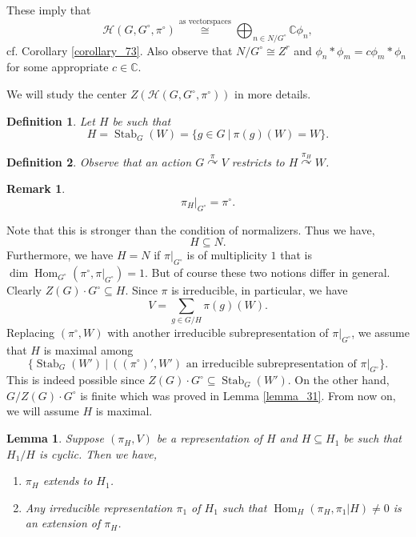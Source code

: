 \documentclass[8pt]{article}
\newtheorem{definition}{Definition}[section]
\newtheorem{lemma}{Lemma}[section]
\newtheorem{remark}{Remark}[section]
\DeclareMathOperator{\Stab}{Stab}
\DeclareMathOperator{\Hom}{Hom}
\newcommand{\C}[0]{\mathbb{C}}
\newcommand{\sep}[0]{\:|\:}
\newcommand{\hecke}[0]{\mathscr{H}}
\begin{document}
These imply that 
\begin{equation*}
  \hecke(G,G^\circ,\pi^\circ)\stackrel{\text{as vectorspaces}}{\cong}\bigoplus_{n\in N/G^\circ}\C\phi_n,
\end{equation*}
cf. Corollary \ref{corollary_73}. Also observe that $N/G^\circ\cong Z^r$ and $\phi_n\ast\phi_m = c\phi_m\ast\phi_n$ for some appropriate $c\in \C$.
\par We will study the center $Z(\hecke(G,G^\circ,\pi^\circ))$ in more details.

\begin{definition}
  Let $H$ be such that 
  \begin{equation*}
    H = \Stab_G(W) = \{g\in G\sep \pi(g)(W) = W\}.
  \end{equation*}
\end{definition}
\begin{definition}
  Observe that an action $G\stackrel{\pi}{\curvearrowright}V$ restricts to $H\stackrel{\pi_H}{\curvearrowright}W$. 
\end{definition}
\begin{remark}
  \begin{equation*}
    \pi_H|_{G^\circ} = \pi^\circ.
  \end{equation*}
\end{remark}
Note that this is stronger than the condition of normalizers. Thus we have, 
  \begin{equation*}
    H\subseteq N.
  \end{equation*}
  Furthermore, we have $H=N$ if $\pi|_{G^\circ}$ is of multiplicity $1$ that is $\dim\Hom_{G^\circ}(\pi^\circ,\pi|_{G^\circ})=1$. But of course these two notions differ in general. Clearly $Z(G)\cdot G^\circ\subseteq H$.
  Since $\pi$ is irreducible, in particular, we have 
  \begin{equation*}
    V = \sum_{g\in G/H}\pi(g)(W).
  \end{equation*}
  Replacing $(\pi^\circ,W)$ with another irreducible subrepresentation of $\pi|_{G^\circ}$, we assume that $H$ is maximal among 
  \begin{equation*}
    \{\Stab_G(W')\sep ((\pi^\circ)',W')\text{ an irreducible subrepresentation of $\pi|_{G^\circ}$}\}.
  \end{equation*}
  This is indeed possible since $Z(G)\cdot G^\circ\subseteq\Stab_G(W')$. On the other hand, $G/Z(G)\cdot G^\circ$ is finite which was proved in Lemma \ref{lemma_31}. From now on, we will assume $H$ is maximal.
  \begin{lemma}
    Suppose $(\pi_H,V)$ be a representation of $H$ and $H\subseteq H_1$ be such that $H_1/H$ is cyclic. Then we have,
    \begin{enumerate}[1).]
      \item $\pi_H$ extends to $H_1$.
      \item Any irreducible representation $\pi_1$ of $H_1$ such that $\Hom_H(\pi_H,\pi_1|H)\not=0$ is an extension of $\pi_H$.
    \end{enumerate}
    \label{lemma_92_1}
  \end{lemma}
\end{document}
